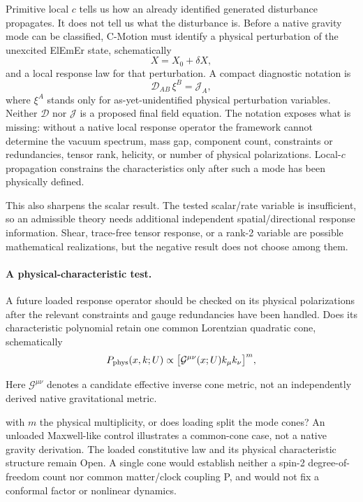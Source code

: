 \documentclass[11pt]{article}
\newcommand{\cmotion}{\mbox{C-Motion}}
\newcommand{\ElEmEr}{\mbox{ElEmEr}}
\theoremstyle{plain}
\theoremstyle{remark}
\begin{document}
Primitive local $c$ tells us how an already identified generated disturbance propagates.  It
does not tell us what the disturbance is.  Before a native gravity mode can be classified,
\cmotion{} must identify a physical perturbation of the unexcited \ElEmEr{} state, schematically
\begin{equation}
X=X_0+\delta X,
\end{equation}
and a local response law for that perturbation.  A compact diagnostic notation is
\begin{equation}
\mathcal D_{AB}\,\xi^B=\mathcal J_A,
\label{eq:diagnostic-native-response}
\end{equation}
where $\xi^A$ stands only for as-yet-unidentified physical perturbation variables.  Neither
$\mathcal D$ nor $\mathcal J$ is a proposed final field equation.  The notation exposes what
is missing: without a native local response operator the framework cannot determine the
vacuum spectrum, mass gap, component count, constraints or redundancies, tensor rank,
helicity, or number of physical polarizations.  Local-$c$ propagation constrains the
characteristics only after such a mode has been physically defined.

This also sharpens the scalar result.  The tested scalar/rate variable is insufficient, so an
admissible theory needs additional independent spatial/directional response information.
Shear, trace-free tensor response, or a rank-2 variable are possible mathematical
realizations, but the negative result does not choose among them.

\paragraph{A physical-characteristic test.}
A future loaded response operator should be checked on its physical
polarizations after the relevant constraints and gauge redundancies have
been handled.  Does its characteristic polynomial retain one common
Lorentzian quadratic cone, schematically
\begin{equation}
 P_{\rm phys}(x,k;U)
 \propto \bigl[\mathcal{G}^{\mu\nu}(x;U)k_\mu k_\nu\bigr]^m,
 \label{eq:physical-cone-test}
\end{equation}

Here $\mathcal{G}^{\mu\nu}$ denotes a candidate effective inverse
cone metric, not an independently derived native gravitational metric.

with $m$ the physical multiplicity, or does loading split the mode cones?
An unloaded Maxwell-like control illustrates a common-cone
case, not a native gravity derivation.  The loaded constitutive law and its
physical characteristic structure remain Open.  A single cone would
establish neither a spin-2 degree-of-freedom count nor common matter/clock
coupling P, and would not fix a conformal factor or nonlinear dynamics.
\end{document}
